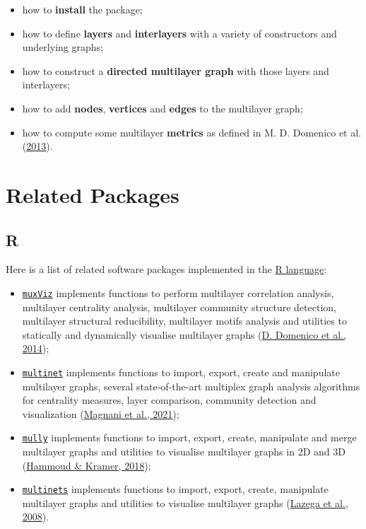 \documentclass[
]{article}
\providecommand{\tightlist}{%
  \setlength{\itemsep}{0pt}\setlength{\parskip}{0pt}}
\begin{document}
\begin{itemize}
\tightlist
\item
  how to \textbf{install} the package;
\item
  how to define \textbf{layers} and \textbf{interlayers} with a variety
  of constructors and underlying graphs;
\item
  how to construct a \textbf{directed multilayer graph} with those
  layers and interlayers;
\item
  how to add \textbf{nodes}, \textbf{vertices} and \textbf{edges} to the
  multilayer graph;
\item
  how to compute some multilayer \textbf{metrics} as defined in M. D.
  Domenico et al. (\protect\hyperlink{ref-DeDomenico2013}{2013}).
\end{itemize}

\hypertarget{related-packages}{%
\section{Related Packages}\label{related-packages}}

\hypertarget{r}{%
\subsection{R}\label{r}}

Here is a list of related software packages implemented in the
\href{https://www.r-project.org}{R language}:

\begin{itemize}
\tightlist
\item
  \href{https://github.com/manlius/muxViz}{\texttt{muxViz}} implements
  functions to perform multilayer correlation analysis, multilayer
  centrality analysis, multilayer community structure detection,
  multilayer structural reducibility, multilayer motifs analysis and
  utilities to statically and dynamically visualise multilayer graphs
  (\protect\hyperlink{ref-DeDomenico2014}{D. Domenico et al., 2014});
\item
  \href{https://github.com/cran/multinet}{\texttt{multinet}} implements
  functions to import, export, create and manipulate multilayer graphs,
  several state-of-the-art multiplex graph analysis algorithms for
  centrality measures, layer comparison, community detection and
  visualization (\protect\hyperlink{ref-Magnani2021}{Magnani et al.,
  2021});
\item
  \href{https://github.com/frankkramer-lab/mully}{\texttt{mully}}
  implements functions to import, export, create, manipulate and merge
  multilayer graphs and utilities to visualise multilayer graphs in 2D
  and 3D (\protect\hyperlink{ref-Hammoud2018}{Hammoud \& Kramer, 2018});
\item
  \href{https://github.com/neylsoncrepalde/multinets}{\texttt{multinets}}
  implements functions to import, export, create, manipulate multilayer
  graphs and utilities to visualise multilayer graphs
  (\protect\hyperlink{ref-Lazega2008}{Lazega et al., 2008}).
\end{itemize}
\end{document}
